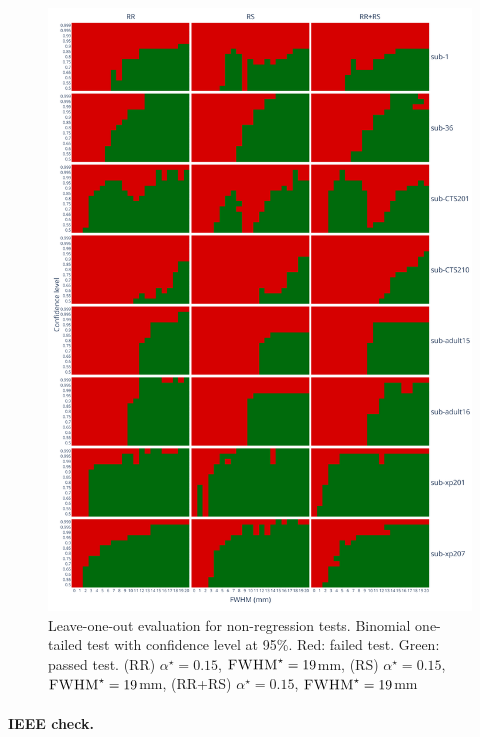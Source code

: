 \documentclass{article}
\newcommand{\fwhm}{\textsc{FWHM}}
\begin{document}
\begin{figure}
    \centering
    \includegraphics[width=\linewidth]{figures/exclude_mct.pdf}
    \caption{Leave-one-out evaluation for non-regression tests.
        Binomial one-tailed test with confidence level at 95\%.
        Red: failed test. Green: passed test.
        (RR) $\alpha^\star=0.15$, $\fwhm^\star=19$mm,
        (RS) $\alpha^\star=0.15$, $\fwhm^\star=19$mm,
        (RR+RS) $\alpha^\star=0.15$, $\fwhm^\star=19$mm}
    \label{fig:loo_bonferroni}
\end{figure}


\paragraph{IEEE check.}
\end{document}
